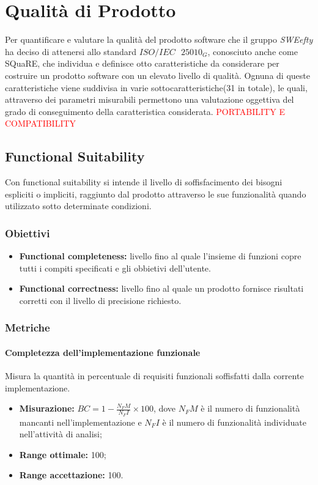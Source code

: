 \section{Qualità di Prodotto}
Per quantificare e valutare la qualità del prodotto software che il gruppo \textit{SWEefty} ha deciso di attenersi allo standard $ISO/IEC\text{ }25010_G$, conosciuto anche come SQuaRE, che individua e definisce otto caratteristiche da considerare per costruire un prodotto software con un elevato livello di qualità. Ognuna di queste caratteristiche viene suddivisa in varie sottocaratteristiche(31 in totale), le quali, attraverso dei parametri misurabili  permettono una valutazione oggettiva del grado di conseguimento della caratteristica considerata.
\textcolor{red}{PORTABILITY E COMPATIBILITY}
 
	\subsection{Functional Suitability}
	Con functional suitability si intende il livello di soffisfacimento dei bisogni espliciti o impliciti, raggiunto dal prodotto attraverso le sue funzionalità quando utilizzato sotto determinate condizioni.
		\subsubsection{Obiettivi}
			\begin{itemize}
				\item {\textbf{Functional completeness:} livello fino al quale l'insieme di funzioni copre tutti i compiti specificati e gli obbietivi dell'utente.}
				\item {\textbf{Functional correctness:} livello fino al quale un prodotto fornisce risultati corretti con il livello di precisione richiesto.}
			\end{itemize}
		\subsubsection{Metriche}
			\paragraph{Completezza dell'implementazione funzionale}\Spazio
			 Misura la quantità in percentuale di requisiti funzionali soffisfatti dalla corrente implementazione.
			\begin{itemize}
				\item {\textbf{Misurazione:}  $BC=1-\frac{N_FM}{N_FI}\times 100$, dove $N_FM$  è il numero di funzionalità mancanti nell'implementazione e $N_FI$ è il numero di funzionalità individuate nell'attività di analisi};
				\item {\textbf{Range ottimale:} 100;}
				\item {\textbf{Range accettazione:} 100.}
			\end{itemize} 

